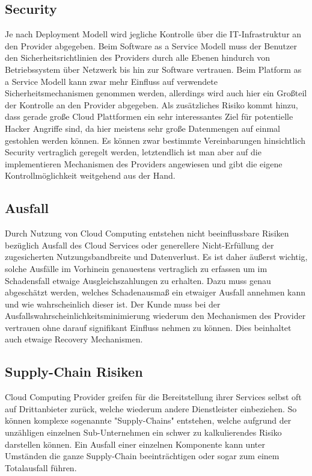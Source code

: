 \documentclass[a4paper,11pt]{article}
\begin{document}
\subsection{Security}
Je nach Deployment Modell wird jegliche Kontrolle über die IT-Infrastruktur an den Provider abgegeben. Beim Software as a Service Modell muss der Benutzer den Sicherheitsrichtlinien des Providers durch alle Ebenen hindurch von Betriebssystem über Netzwerk bis hin zur Software vertrauen. Beim Platform as a Service Modell kann zwar mehr Einfluss auf verwendete Sicherheitsmechanismen genommen werden, allerdings wird auch hier ein Großteil der Kontrolle an den Provider abgegeben. Als zusätzliches Risiko kommt hinzu, dass gerade große Cloud Plattformen ein sehr interessantes Ziel für potentielle Hacker Angriffe sind, da hier meistens sehr große Datenmengen auf einmal gestohlen werden können. Es können zwar bestimmte Vereinbarungen hinsichtlich Security vertraglich geregelt werden, letztendlich ist man aber auf die implementieren Mechanismen des Providers angewiesen und gibt die eigene Kontrollmöglichkeit weitgehend aus der Hand.  \cite{bro2008} 

\subsection{Ausfall}
Durch Nutzung von Cloud Computing entstehen nicht beeinflussbare Risiken bezüglich Ausfall des Cloud Services oder generellere Nicht-Erfüllung der zugesicherten Nutzungsbandbreite und Datenverlust. Es ist daher äußerst wichtig, solche Ausfälle im Vorhinein genauestens vertraglich zu erfassen um im Schadensfall etwaige Ausgleichszahlungen zu erhalten. Dazu muss genau abgeschätzt werden, welches Schadenausmaß ein etwaiger Ausfall annehmen kann und wie wahrscheinlich dieser ist. Der Kunde muss bei der Ausfallswahrscheinlichkeitsminimierung wiederum den Mechanismen des Provider vertrauen ohne darauf signifikant Einfluss nehmen zu können. Dies beinhaltet auch etwaige Recovery Mechanismen.  

\subsection{Supply-Chain Risiken}
Cloud Computing Provider greifen für die Bereitstellung ihrer Services selbst oft auf Drittanbieter zurück, welche wiederum andere Dienstleister einbeziehen. So können komplexe sogenannte "Supply-Chains" entstehen, welche aufgrund der unzähligen einzelnen Sub-Unternehmen ein schwer zu kalkulierendes Risiko darstellen können. Ein Ausfall einer einzelnen Komponente kann unter Umständen die ganze Supply-Chain beeinträchtigen oder sogar zum einem Totalausfall führen.  \cite{haa2013}
\end{document}
